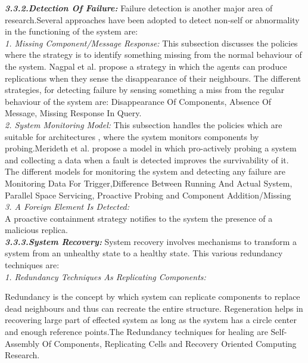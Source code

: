 \textbf{\textit{3.3.2.Detection Of Failure:}}
Failure detection is another major area of research.Several approaches have been adopted
to detect non-self or abnormality in the functioning of the system are:\\

\textit{1. Missing Component/Message Response:}
This subsection discusses the policies where the strategy is to identify something missing from the normal behaviour of the system. Nagpal et al. propose a strategy in which the agents can produce replications when they sense the disappearance of their neighbours. The different strategies, for detecting failure  by sensing something a miss from the regular behaviour of the system are: Disappearance Of Components, Absence Of Message, Missing Response In Query.\\

\textit{2. System Monitoring Model:}
This subsection handles the policies which are suitable for architectures , where the system monitors components by probing.Merideth et al. propose a model in which pro-actively probing a system and collecting a data when a fault is detected improves the survivability of it. The different models for monitoring the system and detecting any failure are Monitoring Data For Trigger,Difference Between Running And Actual System, Parallel Space Servicing, Proactive Probing and Component Addition/Missing\\

\textit{3. A Foreign Element Is Detected:\\}
A proactive containment strategy notifies to the system the presence of a malicious replica.\\

\textbf{\textit{3.3.3.System Recovery:}}
System recovery involves mechanisms to transform a system from an unhealthy state to a healthy state. 
This various redundancy techniques are:\\

\textit{1. Redundancy Techniques As Replicating Components:}

Redundancy is the concept by which system can replicate components to replace dead neighbours and thus can recreate the entire structure.
Regeneration helps in recovering large part of effected system as long as the system has a circle center and enough reference points.The Redundancy techniques for healing are Self-Assembly Of Components, Replicating Cells and Recovery Oriented Computing Research.\\

